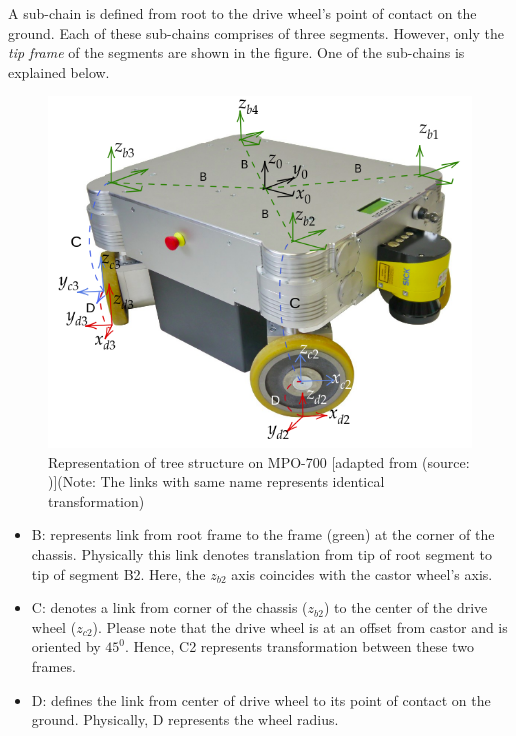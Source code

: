 A sub-chain is defined from root to the drive wheel's point of contact on the ground. Each of these sub-chains comprises of three segments. However, only the \textit{tip frame} of the segments are shown in the figure. One of the sub-chains is explained below.

\begin{figure}[h!]
	\begin{center}
		\includegraphics[scale=0.5]{images/MPO-700-tree}
	\end{center}	
	\caption{Representation of tree structure on MPO-700 [adapted from (source: \cite{MPO700-Datasheet})](Note: The links with same name represents identical transformation)}
	\label{fig:tree-MPO}
\end{figure}

\begin{itemize}
	\item B: represents link from root frame to the frame (green) at the corner of the chassis. Physically this link denotes translation from tip of root segment to tip of segment B2. Here, the $z_{b2}$ axis coincides with the castor wheel's axis.
	\item C: denotes a link from corner of the chassis ($z_{b2}$) to the center of the drive wheel ($z_{c2}$). Please note that the drive wheel is at an offset from castor and is oriented by $45^0$. Hence, C2 represents transformation between these two frames.
	\item D: defines the link from center of drive wheel to its point of contact on the ground. Physically, D represents the wheel radius. 
\end{itemize}




